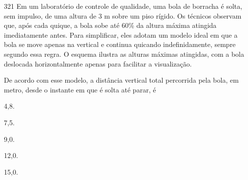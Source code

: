 \begin{questaoinedita}{3}{21}
Em um laboratório de controle de qualidade, uma bola de borracha é solta, sem
impulso, de uma altura de 3 m sobre um piso rígido. Os técnicos observam que,
após cada quique, a bola sobe até 60\% da altura máxima atingida imediatamente
antes. Para simplificar, eles adotam um modelo ideal em que a bola se move
apenas na vertical e continua quicando indefinidamente, sempre segundo essa
regra. O esquema ilustra as alturas máximas atingidas, com a bola deslocada
horizontalmente apenas para facilitar a visualização.

\begin{center}
\end{center}

De acordo com esse modelo, a distância vertical total percorrida pela bola,
em metro, desde o instante em que é solta até parar, é
\begin{alternativas*}[5]
  \item 4,8.
  \item 7,5.
  \item 9,0.
  \item 12,0.
  \item 15,0.
\end{alternativas*}
\end{questaoinedita}

